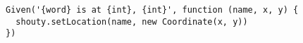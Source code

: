 \begin{verbatim}
Given('{word} is at {int}, {int}', function (name, x, y) {
  shouty.setLocation(name, new Coordinate(x, y))
})
\end{verbatim}
